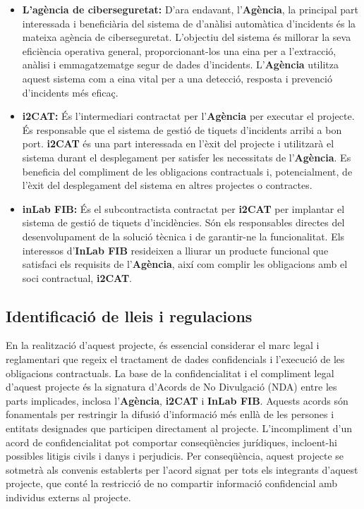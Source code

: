 \begin{itemize}
    \item \textbf{L'agència de ciberseguretat:} D'ara endavant, l'\textbf{Agència}, la principal part interessada i beneficiària del sistema de d'anàlisi automàtica d'incidents és la mateixa agència de ciberseguretat. L'objectiu del sistema és millorar la seva eficiència operativa general, proporcionant-los una eina per a l'extracció, anàlisi i emmagatzematge segur de dades d'incidents. L'\textbf{Agència} utilitza aquest sistema com a eina vital per a una detecció, resposta i prevenció d'incidents més eficaç.
    \item \textbf{i2CAT:} És l'intermediari contractat per l'\textbf{Agència} per executar el projecte. És responsable que el sistema de gestió de tiquets d'incidents arribi a bon port. \textbf{i2CAT} és una part interessada en l'èxit del projecte i utilitzarà el sistema durant el desplegament per satisfer les necessitats de l'\textbf{Agència}. Es beneficia del compliment de les obligacions contractuals i, potencialment, de l'èxit del desplegament del sistema en altres projectes o contractes.
     \item \textbf{inLab FIB:} És el subcontractista contractat per \textbf{i2CAT} per implantar el sistema de gestió de tiquets d'incidències. Són els responsables directes del desenvolupament de la solució tècnica i de garantir-ne la funcionalitat. Els interessos d'\textbf{InLab FIB} resideixen a lliurar un producte funcional que satisfaci els requisits de l'\textbf{Agència}, així com complir les obligacions amb el soci contractual, \textbf{i2CAT}.
\end{itemize}


\subsection{Identificació de lleis i regulacions}
En la realització d'aquest projecte, és essencial considerar el marc legal i reglamentari que regeix el tractament de dades confidencials i l'execució de les obligacions contractuals. La base de la confidencialitat i el compliment legal d'aquest projecte és la signatura d'Acords de No Divulgació (NDA) entre les parts implicades, inclosa l'\textbf{Agència}, \textbf{i2CAT} i \textbf{InLab FIB}. 
Aquests acords són fonamentals per restringir la difusió d'informació més enllà de les persones i entitats designades que participen directament al projecte. L'incompliment d'un acord de confidencialitat pot comportar conseqüències jurídiques, incloent-hi possibles litigis civils i danys i perjudicis. Per conseqüència, aquest projecte se sotmetrà als convenis establerts per l'acord signat per tots els integrants d'aquest projecte, que conté la restricció de no compartir informació confidencial amb individus externs al projecte.

